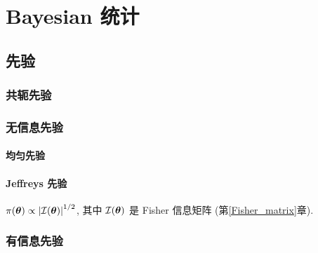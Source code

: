\chapter{Bayesian 统计}

\section{先验}

\subsection{共轭先验}

\subsection{无信息先验}

\subsubsection{均匀先验}

\subsubsection{Jeffreys 先验}

$\pi(\boldsymbol{\theta})\propto\left\lvert \mathcal{I}(\boldsymbol{\theta})\right\rvert ^{1/2}$, 其中 $\mathcal{I}(\boldsymbol{\theta})$ 是 Fisher 信息矩阵 (第\ref{Fisher_matrix}章).

\subsection{有信息先验}
